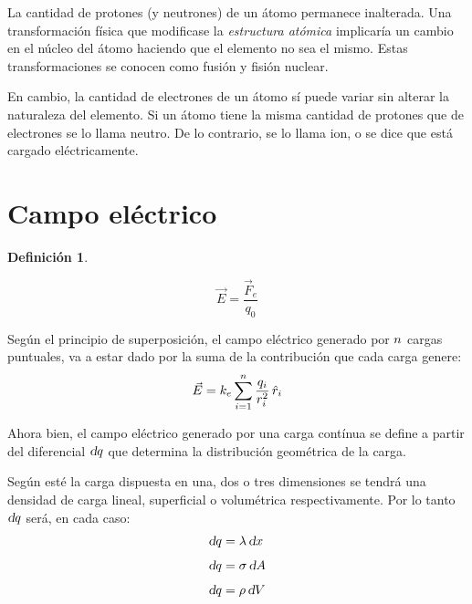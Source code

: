 \documentclass[a5paper,12pt,twoside]{book}
\newtheorem{defn}{{Definición}}[chapter]
\begin{document}
La cantidad de protones (y neutrones) de un átomo permanece inalterada. Una transformación física que modificase la \emph{estructura atómica} implicaría un cambio en el núcleo del átomo haciendo que el elemento no sea el mismo. Estas transformaciones se conocen como fusión y fisión nuclear.

En cambio, la cantidad de electrones de un átomo sí puede variar sin alterar la naturaleza del elemento. Si un átomo tiene la misma cantidad de protones que de electrones se lo llama neutro. De lo contrario, se lo llama ion, o se dice que está cargado eléctricamente.


\section{Campo eléctrico}

\begin{mdframed}[style=MyFrame1]
    \begin{defn}
    \end{defn}
    \begin{equation*}
        \Vec{E} = \frac{\Vec{F}_e}{q_0}
    \end{equation*}
\end{mdframed}

Según el principio de superposición, el campo eléctrico generado por $n$ cargas puntuales, va a estar dado por la suma de la contribución que cada carga genere:
\begin{equation}
    \Vec{E}= k_e \sum_{i=1}^n \frac{q_i}{r_i^2} \, \hat{r}_i
\end{equation}

Ahora bien, el campo eléctrico generado por una carga contínua se define a partir del diferencial $\textsl{d} q$ que determina la distribución geométrica de la carga.

Según esté la carga dispuesta en una, dos o tres dimensiones se tendrá una densidad de carga lineal, superficial o volumétrica respectivamente. Por lo tanto $\textsl{d} q$ será, en cada caso:
\begin{align*}
    \textsl{d} q &= \lambda \, \textsl{d} x
    \\[1ex]
    \textsl{d} q &= \sigma \, \textsl{d} A
    \\[1ex]
    \textsl{d} q &= \rho \, \textsl{d} V
\end{align*}
\end{document}
